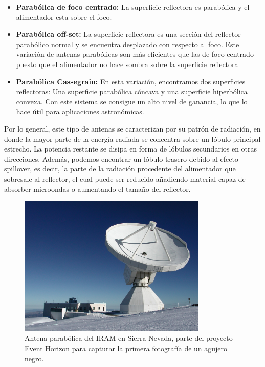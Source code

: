 \begin{itemize}
	\item \textbf{Parabólica de foco centrado: }La superficie reflectora es parabólica y el alimentador esta sobre el foco.
	\item \textbf{Parabólica off-set: }La superficie reflectora es una sección del reflector parabólico normal y se encuentra desplazado con respecto al foco. Este variación de antenas parabólicas son más eficientes que las de foco centrado puesto que el alimentador no hace sombra sobre la superficie reflectora
	\item \textbf{Parabólica Cassegrain: }En esta variación, encontramos dos superficies reflectoras: Una superficie parabólica cóncava y una superficie hiperbólica convexa. Con este sistema se consigue un alto nivel de ganancia, lo que lo hace útil para aplicaciones astronómicas.
\end{itemize}

\par Por lo general, este tipo de antenas se caracterizan por su patrón de radiación, en donde la mayor parte de la energía radiada se concentra sobre un lóbulo principal estrecho. La potencia restante se disipa en forma de lóbulos secundarios en otras direcciones. Además, podemos encontrar un lóbulo trasero debido al efecto spillover, es decir, la parte de la radiación procedente del alimentador que sobresale al reflector, el cual puede ser reducido añadiendo material capaz de absorber microondas o aumentando el tamaño del reflector. 


\begin{figure}[h]
    \centering
        \includegraphics[width=0.8\textwidth]{archivos/parab}
        \caption{Antena parabólica del IRAM en Sierra Nevada, parte del proyecto Event Horizon para capturar la primera fotografía de un agujero negro. \cite{MICIU2019}}
        \label{fig:parabolica}
\end{figure}

